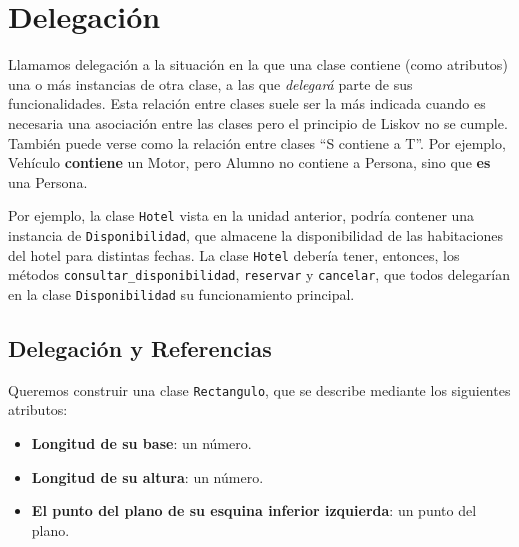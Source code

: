 \section{Delegación}

Llamamos delegación a la situación en la que una clase contiene (como
atributos) una o más instancias de otra clase, a las que \emph{delegará}
parte de sus funcionalidades. Esta relación entre clases suele ser la más
indicada cuando es necesaria una asociación entre las clases pero el
principio de Liskov no se cumple. También puede verse como la relación
entre clases ``S contiene a T''. Por ejemplo, Vehículo {\bf contiene} un
Motor, pero Alumno no contiene a Persona, sino que {\bf es} una Persona.

Por ejemplo, la clase \lstinline!Hotel! vista en la unidad anterior, podría
contener una instancia de \lstinline!Disponibilidad!, que almacene la
disponibilidad de las habitaciones del hotel para distintas fechas.  La
clase \lstinline!Hotel! debería tener, entonces, los métodos
\lstinline!consultar_disponibilidad!, \lstinline!reservar! y
\lstinline!cancelar!, que todos delegarían en la clase
\lstinline!Disponibilidad! su funcionamiento principal.




\subsection*{Delegación y Referencias}

Queremos construir una clase \lstinline!Rectangulo!, que se describe
mediante los siguientes atributos:

\begin{itemize}
\item {\bf Longitud de su base}: un número.

\item {\bf Longitud de su altura}: un número.

\item {\bf El punto del plano de su esquina inferior izquierda}: un punto del plano.

\end{itemize}

